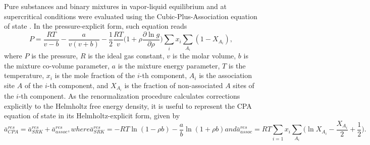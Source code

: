 \documentclass[preprint,12pt,3p]{elsarticle}
\begin{document}
    Pure substances and binary mixtures in vapor-liquid equilibrium and at supercritical conditions were evaluated using the Cubic-Plus-Association equation of state \cite{kontogeorgis1996equation}. In the pressure-explicit form, such equation reads
\begin{equation} \label{eq:pressure_cpa}
P = \frac{RT}{v-b}-\frac{a}{v(v+b)}-\frac{1}{2}\frac{RT}{v} \Big(1+\rho\frac{\partial \ln g}{\partial \rho}\Big)\sum_{i} x_{i} \sum_{A_{i}}(1-X_{A_{i}}),
\end{equation}
    where $P$ is the pressure, $R$ is the ideal gas constant, $v$ is the molar volume, $b$ is the mixture co-volume parameter, $a$ is the mixture energy parameter, $T$ is the temperature, $x_{i}$ is the mole fraction of the $i$-th component, $A_{i}$ is the association site $A$ of the $i$-th component, and $X_{A_{i}}$ is the fraction of non-associated $A$ sites of the $i$-th component. As the renormalization procedure calculates corrections explicitly to the Helmholtz free energy density, it is useful to represent the CPA equation of state in its Helmholtz-explicit form, given by
\begin{subequations}
\begin{equation} \label{eq:helm_res_cpa}
\bar{a}_{CPA}^{res} =\bar{a}_{SRK}^{res} + \bar{a}_{assoc}^{res},
\end{equation}
where
\begin{equation} \label{eq:helm_res_srk}
\bar{a}_{SRK}^{res} = -RT\ln(1-\rho b)-\frac{a}{b}\ln(1+\rho b)   
\end{equation}
and
\begin{equation} \label{eq:helm_res_assoc}
\bar{a}_{assoc}^{res} = RT\sum_{i=1} x_{i} \sum_{A_{i}}\Big(\ln X_{A_{i}} - \frac{X_{A_{i}}}{2} + \frac{1}{2}\Big).
\end{equation}
\end{subequations}
\end{document}

